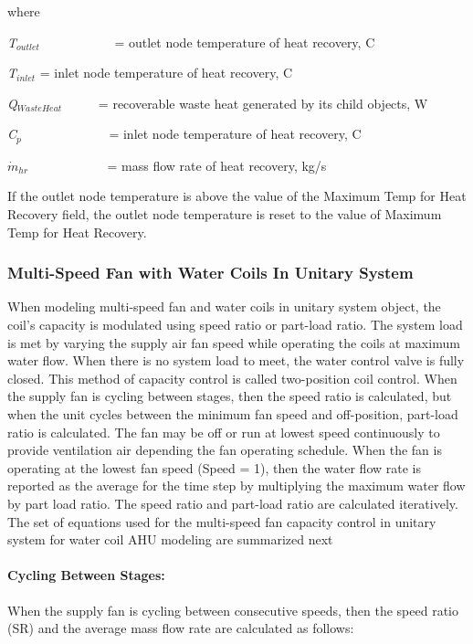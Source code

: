 where

\emph{T\(_{outlet}\)}~~~~~~~~~~~ = outlet node temperature of heat recovery, C

\emph{T\(_{inlet}\)} = inlet node temperature of heat recovery, C

\emph{Q\(_{WasteHeat}\)}~~~~~ = recoverable waste heat generated by its child objects, W

\emph{C\(_{p}\)}~~~~~~~~~~~~~ = inlet node temperature of heat recovery, C

\({\dot m_{hr}}\) ~~~~~~~~~~~ = mass flow rate of heat recovery, kg/s

If the outlet node temperature is above the value of the Maximum Temp for Heat Recovery field, the outlet node temperature is reset to the value of Maximum Temp for Heat Recovery.

\subsubsection{Multi-Speed Fan with Water Coils In Unitary System}\label{multi-speed-fan-with-water-coils-in-unitary-system}

When modeling multi-speed fan and water coils in unitary system object, the coil's capacity is modulated using speed ratio or part-load ratio. The system load is met by varying the supply air fan speed while operating the coils at maximum water flow. When there is no system load to meet, the water control valve is fully closed. This method of capacity control is called two-position coil control. When the supply fan is cycling between stages, then the speed ratio is calculated, but when the unit cycles between the minimum fan speed and off-position, part-load ratio is calculated. The fan may be off or run at lowest speed continuously to provide ventilation air depending the fan operating schedule. When the fan is operating at the lowest fan speed (Speed = 1), then the water flow rate is reported as the average for the time step by multiplying the maximum water flow by part load ratio. The speed ratio and part-load ratio are calculated iteratively. The set of equations used for the multi-speed fan capacity control in unitary system for water coil AHU modeling are summarized next

\paragraph{Cycling Between Stages:}\label{cycling-between-stages}

When the supply fan is cycling between consecutive speeds, then the speed ratio (SR) and the average mass flow rate are calculated as follows:

